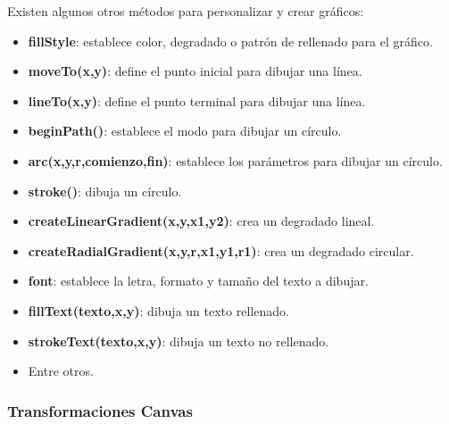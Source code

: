 Existen algunos otros métodos para personalizar y crear gráficos:
\begin{itemize}
    \item \textbf{fillStyle}: establece color, degradado o patrón de rellenado para el gráfico.
    \item \textbf{moveTo(x,y)}: define el punto inicial para dibujar una línea.
    \item \textbf{lineTo(x,y)}: define el punto terminal para dibujar una línea.
    \item \textbf{beginPath()}: establece el modo para dibujar un círculo.
    \item \textbf{arc(x,y,r,comienzo,fin)}: establece los parámetros para dibujar un círculo.
    \item \textbf{stroke()}: dibuja un círculo.
    \item \textbf{createLinearGradient(x,y,x1,y2)}: crea un degradado lineal.
    \item \textbf{createRadialGradient(x,y,r,x1,y1,r1)}: crea un degradado circular.
    \item \textbf{font}: establece la letra, formato y tamaño del texto a dibujar.
    \item \textbf{fillText(texto,x,y)}: dibuja un texto rellenado.
    \item \textbf{strokeText(texto,x,y)}: dibuja un texto no rellenado.
    \item Entre otros.
\end{itemize}


\subsubsection{Transformaciones Canvas}

